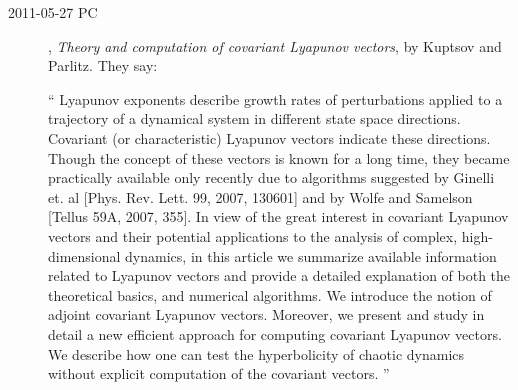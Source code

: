 \begin{description}
\item[2011-05-27 PC] ,
\emph{Theory and computation of covariant Lyapunov vectors},
by Kuptsov and Parlitz. They say:

``
 Lyapunov exponents describe growth
rates of perturbations applied to a trajectory of a dynamical system in
different state space directions. Covariant (or characteristic) Lyapunov
vectors indicate these directions. Though the concept of these vectors is known
for a long time, they became practically available only recently due to
algorithms suggested by Ginelli et. al [Phys. Rev. Lett. 99, 2007, 130601] and
by Wolfe and Samelson [Tellus 59A, 2007, 355]. In view of the great interest in
covariant Lyapunov vectors and their potential applications to the
analysis of complex, high-dimensional dynamics, in this article we summarize
available information related to Lyapunov vectors and provide a detailed
explanation of both the theoretical basics, and numerical algorithms. We
introduce the notion of adjoint covariant Lyapunov vectors. Moreover, we
present and study in detail a new efficient approach for computing covariant
Lyapunov vectors. We describe how one can test the
hyperbolicity of chaotic dynamics without explicit computation of the covariant
vectors.
''
\end{description}



\renewcommand{\ssp}{a}
